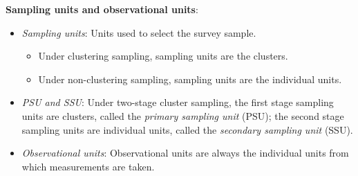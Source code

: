 \documentclass[oneside]{book}\usepackage[]{graphicx}\usepackage[svgnames]{xcolor}
\begin{document}
\textbf{Sampling units and observational units}:
\begin{itemize}
      \item \emph{Sampling units}: Units used to select the survey sample.
            \begin{itemize}
                  \item Under clustering sampling, sampling units are the clusters.
                  \item Under non-clustering sampling, sampling units are the individual
                        units.
            \end{itemize}
      \item \emph{PSU and SSU}: Under two-stage cluster sampling, the first stage
            sampling units are clusters, called the \emph{primary sampling unit}
            (PSU); the second stage sampling units are individual units,
            called the \emph{secondary sampling unit} (SSU).
      \item \emph{Observational units}: Observational units are always the individual units from which
            measurements are taken.
\end{itemize}
\end{document}
